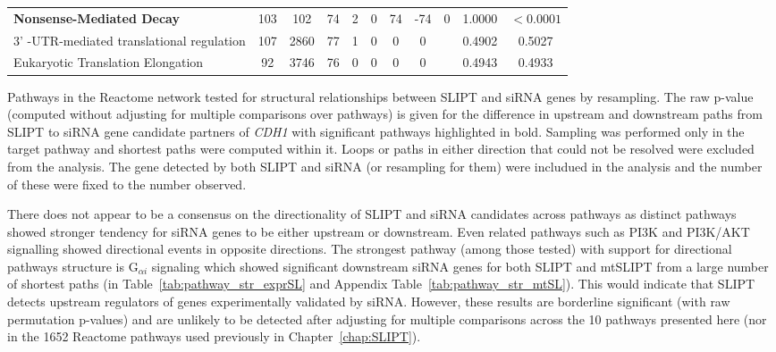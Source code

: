 \begin{table*}[!htb]
{{\begin{threeparttable}
\begin{tabular}{l|cc|cc|cccc|cc}
\rowcolor{black!5}
\textbf{Nonsense-Mediated Decay}                   & 103         & 102          & 74            & 2           & 0    & 74   & -74     & 0            & 1.0000             & $<0.0001$                   \\
\rowcolor{black!10}
3' -UTR-mediated translational regulation & 107         & 2860         & 77            & 1           & 0    & 0    & 0       &              & 0.4902             & 0.5027              \\
\rowcolor{black!5}
Eukaryotic Translation Elongation         & 92          & 3746         & 76            & 0           & 0    & 0    & 0       &              & 0.4943             & 0.4933              \\
\hline
\end{tabular}
\begin{tablenotes}
\raggedright \small
Pathways in the Reactome network tested for structural relationships between \gls{SLIPT} and \gls{siRNA} genes by resampling. The raw p-value (computed without adjusting for multiple comparisons over pathways) is given for the difference in upstream and downstream paths from \gls{SLIPT} to \gls{siRNA} gene candidate partners of \textit{CDH1} with significant pathways highlighted in bold. Sampling was performed only in the target pathway and shortest paths were computed within it. Loops or paths in either direction that could not be resolved were excluded from the analysis. The gene detected by both \gls{SLIPT} and \gls{siRNA} (or resampling for them) were includued in the analysis and the number of these were fixed to the number observed.
\end{tablenotes}
\end{threeparttable}
}
}
\end{table*}

There does not appear to be a consensus on the directionality of \gls{SLIPT} and \gls{siRNA} candidates across pathways as distinct pathways showed stronger tendency for \gls{siRNA} genes to be either upstream or downstream. Even related pathways such as \gls{PI3K} and PI3K/AKT signalling showed directional events in opposite directions. The strongest pathway (among those tested) with support for directional pathways structure is G$_{\alpha i}$ signaling which showed significant downstream \gls{siRNA} genes for both SLIPT and mtSLIPT from a large number of shortest paths (in Table~\ref{tab:pathway_str_exprSL} and Appendix Table~\ref{tab:pathway_str_mtSL}). This would indicate that \gls{SLIPT} detects upstream regulators of genes experimentally validated by \gls{siRNA}. However, these results are borderline significant (with raw permutation p-values) and are unlikely to be detected after adjusting for multiple comparisons across the 10 pathways presented here (nor in the 1652 Reactome pathways used previously in Chapter~\ref{chap:SLIPT}).

